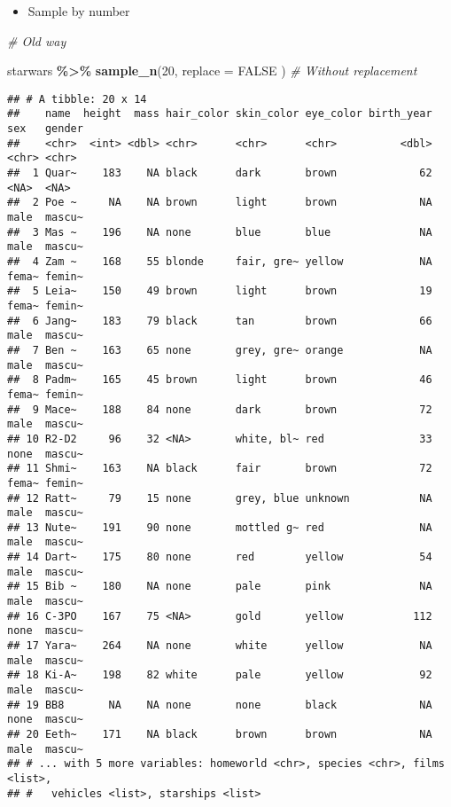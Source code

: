 \documentclass[
]{book}
\newenvironment{Shaded}{\begin{snugshade}}{\end{snugshade}}
\newcommand{\CommentTok}[1]{\textcolor[rgb]{0.56,0.35,0.01}{\textit{#1}}}
\newcommand{\DataTypeTok}[1]{\textcolor[rgb]{0.13,0.29,0.53}{#1}}
\newcommand{\DecValTok}[1]{\textcolor[rgb]{0.00,0.00,0.81}{#1}}
\newcommand{\KeywordTok}[1]{\textcolor[rgb]{0.13,0.29,0.53}{\textbf{#1}}}
\newcommand{\NormalTok}[1]{#1}
\newcommand{\OperatorTok}[1]{\textcolor[rgb]{0.81,0.36,0.00}{\textbf{#1}}}
\newcommand{\OtherTok}[1]{\textcolor[rgb]{0.56,0.35,0.01}{#1}}
\newcommand{\StringTok}[1]{\textcolor[rgb]{0.31,0.60,0.02}{#1}}
\providecommand{\tightlist}{%
  \setlength{\itemsep}{0pt}\setlength{\parskip}{0pt}}
\begin{document}
\begin{itemize}
\tightlist
\item
  Sample by number
\end{itemize}

\begin{Shaded}
\begin{Highlighting}[]
\CommentTok{\# Old way}

\NormalTok{starwars }\OperatorTok{\%\textgreater{}\%}
\StringTok{  }\KeywordTok{sample\_n}\NormalTok{(}\DecValTok{20}\NormalTok{,}
    \DataTypeTok{replace =} \OtherTok{FALSE}
\NormalTok{  ) }\CommentTok{\# Without replacement}
\end{Highlighting}
\end{Shaded}

\begin{verbatim}
## # A tibble: 20 x 14
##    name  height  mass hair_color skin_color eye_color birth_year sex   gender
##    <chr>  <int> <dbl> <chr>      <chr>      <chr>          <dbl> <chr> <chr> 
##  1 Quar~    183    NA black      dark       brown             62 <NA>  <NA>  
##  2 Poe ~     NA    NA brown      light      brown             NA male  mascu~
##  3 Mas ~    196    NA none       blue       blue              NA male  mascu~
##  4 Zam ~    168    55 blonde     fair, gre~ yellow            NA fema~ femin~
##  5 Leia~    150    49 brown      light      brown             19 fema~ femin~
##  6 Jang~    183    79 black      tan        brown             66 male  mascu~
##  7 Ben ~    163    65 none       grey, gre~ orange            NA male  mascu~
##  8 Padm~    165    45 brown      light      brown             46 fema~ femin~
##  9 Mace~    188    84 none       dark       brown             72 male  mascu~
## 10 R2-D2     96    32 <NA>       white, bl~ red               33 none  mascu~
## 11 Shmi~    163    NA black      fair       brown             72 fema~ femin~
## 12 Ratt~     79    15 none       grey, blue unknown           NA male  mascu~
## 13 Nute~    191    90 none       mottled g~ red               NA male  mascu~
## 14 Dart~    175    80 none       red        yellow            54 male  mascu~
## 15 Bib ~    180    NA none       pale       pink              NA male  mascu~
## 16 C-3PO    167    75 <NA>       gold       yellow           112 none  mascu~
## 17 Yara~    264    NA none       white      yellow            NA male  mascu~
## 18 Ki-A~    198    82 white      pale       yellow            92 male  mascu~
## 19 BB8       NA    NA none       none       black             NA none  mascu~
## 20 Eeth~    171    NA black      brown      brown             NA male  mascu~
## # ... with 5 more variables: homeworld <chr>, species <chr>, films <list>,
## #   vehicles <list>, starships <list>
\end{verbatim}
\end{document}
